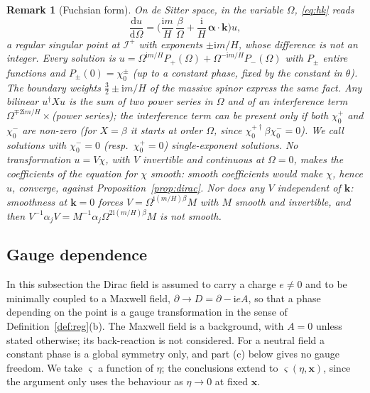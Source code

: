 \documentclass[11pt,a4paper]{article}
\newtheorem{remark}{Remark}
\theoremstyle{definition}
\newcommand{\scri}{\mathscr{I}^{+}}
\newcommand{\dd}{\mathrm{d}}
\newcommand{\ii}{\mathrm{i}}
\begin{document}
\begin{remark}[Fuchsian form]
\label{rem:fuchs}
On de Sitter space, in the variable $\Omega$, \eqref{eq:hk} reads
\begin{equation}
\frac{\dd u}{\dd\Omega}=\Big(\frac{\ii m}{H}\,\frac{\beta}{\Omega}+\frac{\ii}{H}\,\boldsymbol\alpha\cdot\mathbf{k}\Big)u ,
\end{equation}
a regular singular point at $\scri$ with exponents $\pm\ii m/H$, whose difference is not an integer. Every solution is $u=\Omega^{\ii m/H}P_{+}(\Omega)+\Omega^{-\ii m/H}P_{-}(\Omega)$ with $P_{\pm}$ entire functions and $P_{\pm}(0)=\chi_{0}^{\pm}$ (up to a constant phase, fixed by the constant in $\theta$). The boundary weights $\tfrac32\pm\ii m/H$ of the massive spinor express the same fact. Any bilinear $u^{\dagger}Xu$ is the sum of two power series in $\Omega$ and of an interference term $\Omega^{\mp2\ii m/H}\times$(power series); the interference term can be present only if both $\chi_{0}^{+}$ and $\chi_{0}^{-}$ are non-zero (for $X=\beta$ it starts at order $\Omega$, since $\chi_{0}^{+\dagger}\beta\chi_{0}^{-}=0$). We call solutions with $\chi_{0}^{-}=0$ (resp.\ $\chi_{0}^{+}=0$) \emph{single-exponent} solutions. No transformation $u=V\chi$, with $V$ invertible and continuous at $\Omega=0$, makes the coefficients of the equation for $\chi$ smooth: smooth coefficients would make $\chi$, hence $u$, converge, against Proposition~\ref{prop:dirac}. Nor does any $V$ independent of $\mathbf{k}$: smoothness at $\mathbf{k}=0$ forces $V=\Omega^{\ii(m/H)\beta}M$ with $M$ smooth and invertible, and then $V^{-1}\alpha_{j}V=M^{-1}\alpha_{j}\Omega^{2\ii(m/H)\beta}M$ is not smooth.
\end{remark}

\subsection{Gauge dependence}
\label{sec:gauge}

In this subsection the Dirac field is assumed to carry a charge $e\neq0$ and to be minimally coupled to a Maxwell field, $\partial\to D=\partial-\ii eA$, so that a phase depending on the point is a gauge transformation in the sense of Definition~\ref{def:reg}(b). The Maxwell field is a background, with $A=0$ unless stated otherwise; its back-reaction is not considered. For a neutral field a constant phase is a global symmetry only, and part (c) below gives no gauge freedom. We take $\varsigma$ a function of $\eta$; the conclusions extend to $\varsigma(\eta,\mathbf{x})$, since the argument only uses the behaviour as $\eta\to0$ at fixed $\mathbf{x}$.
\end{document}
